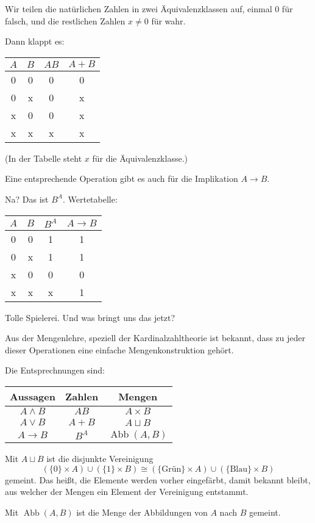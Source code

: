 \documentclass[9pt]{beamer}
\newcommand{\Abb}{\operatorname{Abb}}
\begin{document}
\begin{frame}
Wir teilen die natürlichen Zahlen in zwei Äquivalenzklassen auf,
einmal $0$ für falsch, und die restlichen Zahlen $x\ne 0$
für wahr.\pause

\vspace{1em}
Dann klappt es:
\begin{table}
\begin{tabular}{cccc}
$A$ & $B$ & $AB$ & $A+B$\\
\midrule
0 & 0 & 0 & 0\\
0 & x & 0 & x\\
x & 0 & 0 & x\\
x & x & x & x
\end{tabular}
\end{table}
(In der Tabelle steht $x$ für die Äquivalenzklasse.)
\end{frame}

\begin{frame}
Eine entsprechende Operation gibt es auch für die
Implikation $A\to B$.\pause

\vspace{1em}
Na?\pause{} Das ist $B^A$.\pause{} Wertetabelle:
\begin{table}
\begin{tabular}{cccc}
$A$ & $B$ & $B^A$ & $A\to B$\\
\midrule
0 & 0 & 1 & 1\\
0 & x & 1 & 1\\
x & 0 & 0 & 0\\
x & x & x & 1
\end{tabular}
\end{table}\pause

Tolle Spielerei. Und was bringt uns das jetzt?
\end{frame}

\begin{frame}
Aus der Mengenlehre, speziell der Kardinalzahltheorie ist bekannt,
dass zu jeder dieser Operationen eine einfache Mengenkonstruktion
gehört.\pause

\vspace{1em}
Die Entsprechnungen sind:
\begin{table}
\begin{tabular}{ccc}
Aussagen & Zahlen & Mengen\\
\midrule
$A\land B$ & $AB$  & $A\times B$ \\
$A\lor B$  & $A+B$ & $A\sqcup B$\\
$A\to B$   & $B^A$ & $\Abb(A,B)$
\end{tabular}
\end{table}\pause

Mit $A\sqcup B$ ist die disjunkte Vereinigung
\[(\{0\}\times A)\cup (\{1\}\times B) \cong 
(\{\text{Grün}\}\times A)\cup (\{\text{Blau}\}\times B)\]
gemeint. Das heißt, die Elemente werden vorher eingefärbt,
damit bekannt bleibt, aus welcher der Mengen ein Element der
Vereinigung entstammt.\pause

\vspace{1em}
Mit $\Abb(A,B)$ ist die Menge der Abbildungen von $A$ nach $B$
gemeint.
\end{frame}
\end{document}
